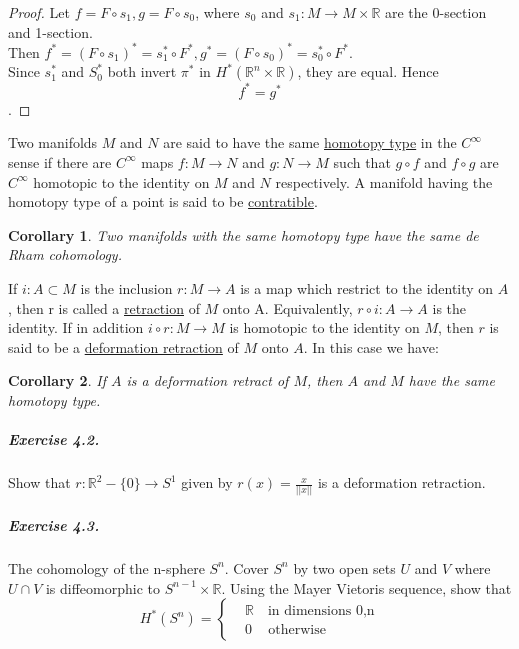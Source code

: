 \documentclass{article}
\newtheorem{corollary}{Corollary}[proposition]
\begin{document}
\begin{proof}
    Let  $ f=F\circ s_1,g=F\circ s_0 $, where  $ s_0 $ and  $ s_1 :M\rightarrow M\times \mathbb{R}$ are the 0-section and 1-section.\\
    Then  $ f^*=(F\circ s_1)^*=s_1^*\circ F^*,g^*=(F\circ s_0)^*=s_0^*\circ F^* $.\\
    Since  $ s_1^* $ and  $ S_0^*  $ both invert  $ \pi^* $ in  $ H^*(\mathbb{R}^n\times\mathbb{R}) $, they are equal. Hence \[ f^*=g^* \]. 
\end{proof}
\qquad Two manifolds  $ M  $ and  $ N  $ are said to have the same \underline{homotopy type} in the  $ C^\infty $ sense if there are  $ C^\infty $ maps  $ f:M\rightarrow N  $ and  $ g:N\rightarrow M  $ such that  $ g\circ f  $ and  $ f\circ g  $ are  $ C^\infty $ homotopic to the identity on  $ M  $ and  $ N  $ respectively. A manifold having the homotopy type of a point is said to be \underline{contratible}.\\
\begin{corollary}
    Two manifolds with the same homotopy type have the same de Rham cohomology.
\end{corollary}
\qquad  If  $ i:A\subset M  $ is the inclusion $ r:M\rightarrow A $ is a map which  restrict to the identity on  $ A $, then r is called a \underline{retraction} of  $ M  $ onto A. Equivalently,  $ r\circ i:A\rightarrow A  $ is the identity. If in addition  $ i\circ r:M\rightarrow M  $ is homotopic to the identity on  $ M  $, then   $ r  $ is said to be a \underline{deformation retraction} of $  M  $ onto  $ A $. In this case  we have:
\begin{corollary}
   If  $ A  $ is a deformation retract of $  M $, then   $ A  $ and  $ M $ have the same homotopy type.
\end{corollary} 
\subparagraph{Exercise 4.2.}Show that  $ r:\mathbb{R}^2-\{0\}\rightarrow S^1 $ given by  $ r(x)=\frac{x }{||x||} $ is a deformation retraction.
\subparagraph{Exercise 4.3.}The cohomology of the n-sphere  $ S^n  $. Cover  $ S^n  $ by two open sets  $ U  $ and  $ V  $ where  $ U\cap V  $ is diffeomorphic to  $ S^{n-1}\times \mathbb{R} $. Using the Mayer Vietoris sequence, show that 
\[
   H^*(S^n)=\left\{
        \begin{aligned}
            &\mathbb{R }\quad \text{in dimensions 0,n}\\
            &0\,\quad \text{otherwise}
        \end{aligned}
   \right. 
\]
\end{document}

